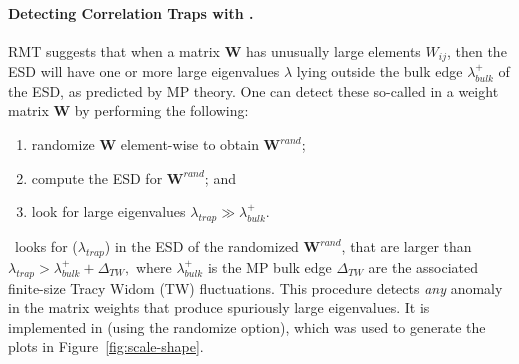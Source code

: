\paragraph{Detecting Correlation Traps with \RMT.}

RMT suggests that when a matrix $\mathbf{W}$ has unusually large elements $W_{ij}$, then the ESD will have one or more large eigenvalues $\lambda$ lying outside the bulk edge $\lambda^{+}_{bulk}$ of the ESD, as predicted by MP theory. 
One can detect these so-called \CorrelationTraps in a weight matrix $\mathbf{W}$ by performing the following:
\begin{enumerate}
\item randomize $\mathbf{W}$ element-wise to obtain $\mathbf{W}^{rand}$;
\item compute the ESD for $\mathbf{W}^{rand}$; and
\item look for large eigenvalues $\lambda_{trap}\gg\lambda^{+}_{bulk}$.
\end{enumerate}
\WW~looks for \CorrelationTraps ($\lambda_{trap}$) in the ESD of the randomized $\mathbf{W}^{rand}$, that are larger than 
$ \lambda_{trap}>\lambda_{bulk}^{+}+\Delta_{TW} , $ 
where 
$\lambda^{+}_{bulk}$ is the MP bulk edge $\Delta_{TW}$ are the associated finite-size Tracy Widom (TW) fluctuations. 
This procedure detects \emph{any} anomaly in the matrix weights that produce spuriously large eigenvalues. 
It is implemented in \WW (using the randomize option), which was used to generate the plots in Figure~\ref{fig:scale-shape}.

